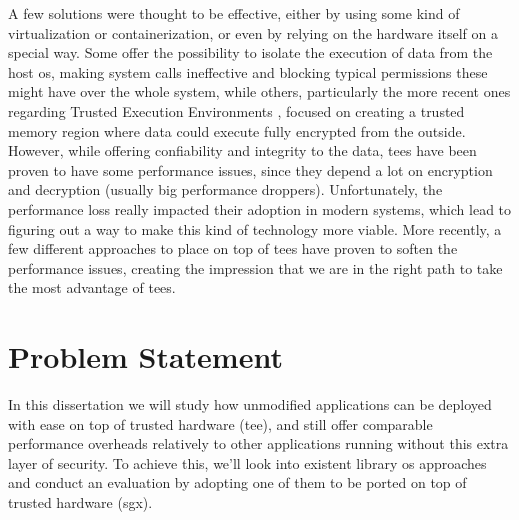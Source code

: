 A few solutions were thought to be effective, either by using some kind of virtualization or containerization, or even by relying on the hardware itself on a special way. 
Some \cite{virtGhostPaper}\cite{flickerPaper}\cite{mushiPaper}\cite{SeCagePaper}\cite{inkTagPaper}\cite{segoPaper} offer the possibility to isolate the execution of data from the host \gls{os}, making system calls ineffective and blocking typical permissions these might have over the whole system, while others, particularly the more recent ones regarding Trusted Execution Environments \cite{armTZPaper}\cite{amdPaper}\cite{sanctumPaper}\cite{intelSGX}, focused on creating a trusted memory region where data could execute fully encrypted from the outside. 
However, while offering confiability and integrity to the data, \gls{tee}s have been proven to have some performance issues, since they depend a lot on encryption and decryption (usually big performance droppers). Unfortunately, the performance loss really impacted their adoption in modern systems, which lead to figuring out a way to make this kind of technology more viable. 
More recently, a few different approaches to place on top of \gls{tee}s have proven to soften the performance issues, creating the impression that we are in the right path to take the most advantage of \gls{tee}s. 


\section{Problem Statement}

In this dissertation we will study how unmodified applications can be deployed with ease on top of trusted hardware (\gls{tee}), and still offer comparable performance overheads relatively to other applications running without this extra layer of security. To achieve this, we'll look into existent library \gls{os} approaches and conduct an evaluation by adopting one of them to be ported on top of trusted hardware (\gls{sgx}). 




